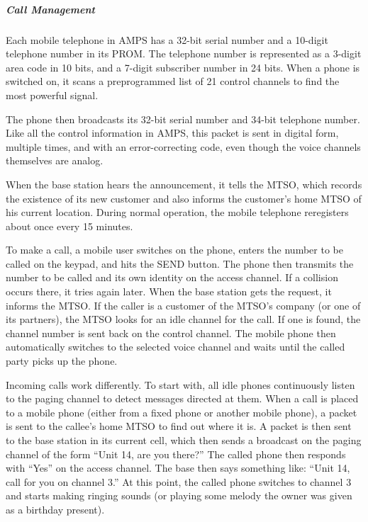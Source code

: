 \protect\hypertarget{0130661023_ch02lev1sec6.htmlux5cux23ch02lev3sec21}{}{}

\subparagraph{Call Management}

Each mobile telephone in AMPS has a 32-bit serial number and a 10-digit
telephone number in its PROM. The telephone number is represented as a
3-digit area code in 10 bits, and a 7-digit subscriber number in 24
bits. When a phone is switched on, it scans a preprogrammed list of 21
control channels to find the most powerful signal.

The phone then broadcasts its 32-bit serial number and 34-bit telephone
number. Like all the control information in AMPS, this packet is sent in
digital form, multiple times, and with an error-correcting code, even
though the voice channels themselves are analog.

When the base station hears the announcement, it tells the MTSO, which
records the existence of its new customer and also informs the
customer's home MTSO of his current location. During normal operation,
the mobile telephone reregisters about once every 15 minutes.

To make a call, a mobile user switches on the phone, enters the number
to be called on the keypad, and hits the SEND button. The phone then
transmits the number to be called and its own identity on the access
channel. If a collision occurs there, it tries again later. When the
base station gets the request, it informs the MTSO. If the caller is a
customer of the MTSO's company (or one of its partners), the MTSO looks
for an idle channel for the call. If one is found, the channel number is
sent back on the control channel. The mobile phone then automatically
switches to the selected voice channel and waits until the called party
picks up the phone.

Incoming calls work differently. To start with, all idle phones
continuously listen to the paging channel to detect messages directed at
them. When a call is placed to a mobile phone (either from a fixed phone
or another mobile phone), a packet is sent to the callee's home MTSO to
find out where it is. A packet is then sent to the base station in its
current cell, which then sends a broadcast on the paging channel of the
form ``Unit 14, are you there?'' The called phone then responds with
``Yes'' on the access channel. The base then says something like: ``Unit
14, call for you on channel 3.'' At this point, the called phone
switches to channel 3 and starts making ringing sounds (or playing some
melody the owner was given as a birthday present).

